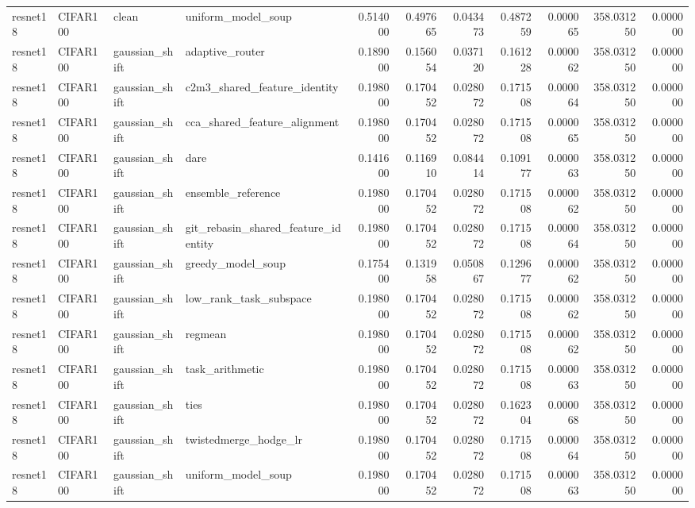 \begin{tabular}{llllrrrrrrr}
resnet18 & CIFAR100 & clean & uniform_model_soup & 0.514000 & 0.497665 & 0.043473 & 0.487259 & 0.000065 & 358.031250 & 0.000000 \\
resnet18 & CIFAR100 & gaussian_shift & adaptive_router & 0.189000 & 0.156054 & 0.037120 & 0.161228 & 0.000062 & 358.031250 & 0.000000 \\
resnet18 & CIFAR100 & gaussian_shift & c2m3_shared_feature_identity & 0.198000 & 0.170452 & 0.028072 & 0.171508 & 0.000064 & 358.031250 & 0.000000 \\
resnet18 & CIFAR100 & gaussian_shift & cca_shared_feature_alignment & 0.198000 & 0.170452 & 0.028072 & 0.171508 & 0.000065 & 358.031250 & 0.000000 \\
resnet18 & CIFAR100 & gaussian_shift & dare & 0.141600 & 0.116910 & 0.084414 & 0.109177 & 0.000063 & 358.031250 & 0.000000 \\
resnet18 & CIFAR100 & gaussian_shift & ensemble_reference & 0.198000 & 0.170452 & 0.028072 & 0.171508 & 0.000062 & 358.031250 & 0.000000 \\
resnet18 & CIFAR100 & gaussian_shift & git_rebasin_shared_feature_identity & 0.198000 & 0.170452 & 0.028072 & 0.171508 & 0.000064 & 358.031250 & 0.000000 \\
resnet18 & CIFAR100 & gaussian_shift & greedy_model_soup & 0.175400 & 0.131958 & 0.050867 & 0.129677 & 0.000062 & 358.031250 & 0.000000 \\
resnet18 & CIFAR100 & gaussian_shift & low_rank_task_subspace & 0.198000 & 0.170452 & 0.028072 & 0.171508 & 0.000062 & 358.031250 & 0.000000 \\
resnet18 & CIFAR100 & gaussian_shift & regmean & 0.198000 & 0.170452 & 0.028072 & 0.171508 & 0.000062 & 358.031250 & 0.000000 \\
resnet18 & CIFAR100 & gaussian_shift & task_arithmetic & 0.198000 & 0.170452 & 0.028072 & 0.171508 & 0.000063 & 358.031250 & 0.000000 \\
resnet18 & CIFAR100 & gaussian_shift & ties & 0.198000 & 0.170452 & 0.028072 & 0.162304 & 0.000068 & 358.031250 & 0.000000 \\
resnet18 & CIFAR100 & gaussian_shift & twistedmerge_hodge_lr & 0.198000 & 0.170452 & 0.028072 & 0.171508 & 0.000064 & 358.031250 & 0.000000 \\
resnet18 & CIFAR100 & gaussian_shift & uniform_model_soup & 0.198000 & 0.170452 & 0.028072 & 0.171508 & 0.000063 & 358.031250 & 0.000000 \\
\bottomrule
\end{tabular}
